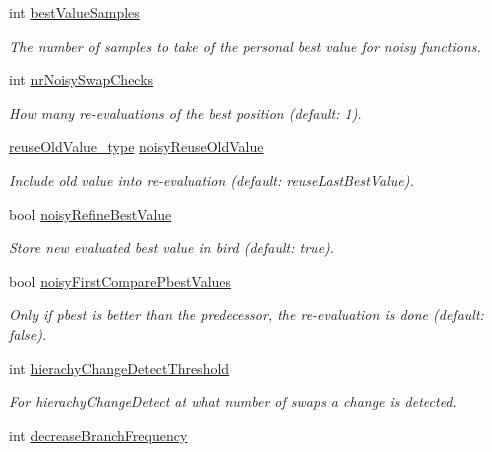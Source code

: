\begin{CompactItemize}
int \hyperlink{classPSO_01865aec8c14163d28f3e759ed70e316}{bestValueSamples}
\begin{CompactList}\small\item\em The number of samples to take of the personal best value for noisy functions. \item\end{CompactList}\item 
int \hyperlink{classPSO_d55215fbf697c2c494f1543df2164d24}{nrNoisySwapChecks}
\begin{CompactList}\small\item\em How many re-evaluations of the best position (default: 1). \item\end{CompactList}\item 
\hyperlink{pso_8h_755d79b857f07ae8fe54530574012aa0}{reuseOldValue\_\-type} \hyperlink{classPSO_05c0da62c3b5e480a1b26762e3309c21}{noisyReuseOldValue}
\begin{CompactList}\small\item\em Include old value into re-evaluation (default: reuseLastBestValue). \item\end{CompactList}\item 
bool \hyperlink{classPSO_b222b8aeb41451da1382476a1d81515b}{noisyRefineBestValue}
\begin{CompactList}\small\item\em Store new evaluated best value in bird (default: true). \item\end{CompactList}\item 
bool \hyperlink{classPSO_a568380cf709fb920e19d510b606db9f}{noisyFirstComparePbestValues}
\begin{CompactList}\small\item\em Only if pbest is better than the predecessor, the re-evaluation is done (default: false). \item\end{CompactList}\item 
int \hyperlink{classPSO_d0a0b95f85244023677a1420d4b5b54d}{hierachyChangeDetectThreshold}
\begin{CompactList}\small\item\em For hierachyChangeDetect at what number of swaps a change is detected. \item\end{CompactList}\item 
int \hyperlink{classPSO_02c898975f3d13ed115abee7002ca3bb}{decreaseBranchFrequency}

\end{CompactItemize}
